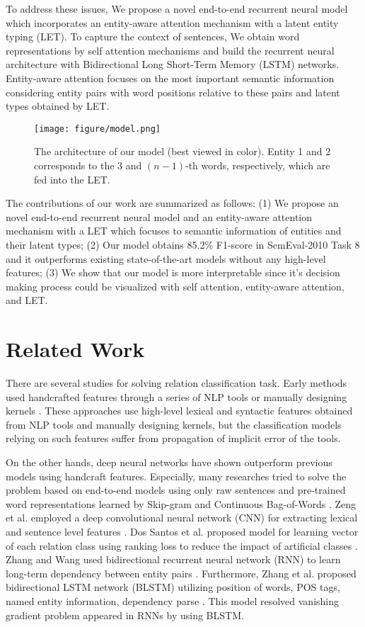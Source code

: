 \documentclass[twoside,leqno,twocolumn]{article}
\begin{document}
To address these issues, We propose a novel end-to-end recurrent neural model which incorporates an entity-aware attention mechanism with a latent entity typing (LET).
To capture the context of sentences, We obtain word representations by self attention mechanisms and build the recurrent neural architecture with Bidirectional Long Short-Term Memory (LSTM) networks.
Entity-aware attention focuses on the most important semantic information considering entity pairs with word positions relative to these pairs and latent types obtained by LET.

\begin{figure*}[!ht]
\texttt{[image: figure/model.png]}
\caption{The architecture of our model (best viewed in color). Entity 1 and 2 corresponds to the $3$ and $(n-1)$-th words, respectively, which are fed into the LET.}
\label{fig:model}
\end{figure*}

The contributions of our work are summarized as follows:
(1) We propose an novel end-to-end recurrent neural model and an entity-aware attention mechanism with a LET which focuses to semantic information of entities and their latent types;
(2) Our model obtains 85.2\% F1-score in SemEval-2010 Task 8 and it outperforms existing state-of-the-art models without any high-level features;
(3) We show that our model is more interpretable since it's decision making process could be visualized with self attention, entity-aware attention, and LET.



\section{Related Work}
There are several studies for solving relation classification task.
Early methods used handcrafted features through a series of NLP tools or manually designing kernels \cite{rink2010utd}.
These approaches use high-level lexical and syntactic features obtained from NLP tools and manually designing kernels, but the classification models relying on such features suffer from propagation of implicit error of the tools.

On the other hands, deep neural networks have shown outperform previous models using handcraft features. 
Especially, many researches tried to solve the problem based on end-to-end models using only raw sentences and pre-trained word representations learned by Skip-gram and Continuous Bag-of-Words \cite{mikolov2013distributed, mikolov2013efficient, pennington2014glove}.
Zeng et al. employed a deep convolutional neural network (CNN) for extracting lexical and sentence level features \cite{zeng2014relation}.
Dos Santos et al. proposed model for learning vector of each relation class using ranking loss to reduce the impact of artificial classes \cite{dos2015classifying}.
Zhang and Wang used bidirectional recurrent neural network (RNN) to learn long-term dependency between entity pairs \cite{zhang2015relation}.
Furthermore, Zhang et al. proposed bidirectional LSTM network (BLSTM) utilizing position of words, POS tags, named entity information, dependency parse \cite{zhang2015bidirectional}.
This model resolved vanishing gradient problem appeared in RNNs by using BLSTM. 
\end{document}
